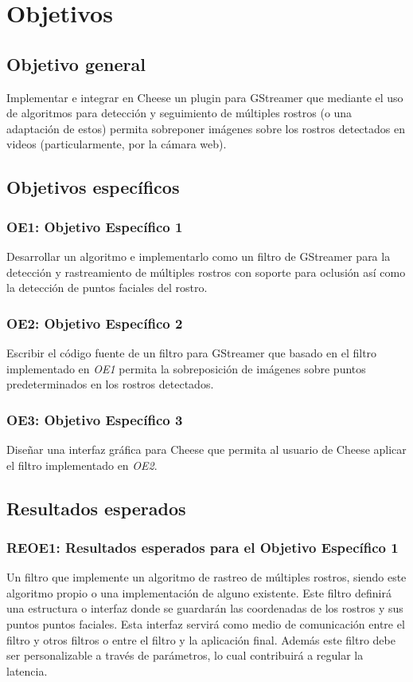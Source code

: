 \documentclass[a4paper,openright,12pt]{report}
\begin{document}
\section{Objetivos}
\subsection{Objetivo general}
Implementar e integrar en Cheese un plugin para GStreamer que mediante el uso de
algoritmos para detección y seguimiento de múltiples rostros (o una adaptación
de estos) permita sobreponer imágenes sobre los rostros detectados en videos
(particularmente, por la cámara web).

\subsection{Objetivos específicos}
\subsubsection{OE1: Objetivo Específico 1}
Desarrollar un algoritmo e implementarlo como un filtro de GStreamer para
la detección y rastreamiento de múltiples rostros con soporte para oclusión
así como la detección de puntos faciales del rostro.
\subsubsection{OE2: Objetivo Específico 2}
Escribir el código fuente de un filtro para GStreamer que basado en el filtro
implementado en \textit{OE1} permita la sobreposición de imágenes sobre puntos
predeterminados en los rostros detectados.
\subsubsection{OE3: Objetivo Específico 3}
Diseñar una interfaz gráfica para Cheese que permita al usuario de Cheese
aplicar el filtro implementado en \textit{OE2}.

\subsection{Resultados esperados}
\subsubsection{REOE1: Resultados esperados para el Objetivo Específico 1}
Un filtro que implemente un algoritmo de rastreo de múltiples rostros, siendo
este algoritmo propio o una implementación de alguno existente. Este filtro
definirá una estructura o interfaz donde se guardarán las coordenadas de los
rostros y sus puntos puntos faciales. Esta interfaz servirá como medio de
comunicación entre el filtro y otros filtros o entre el filtro y la aplicación
final. Además este filtro debe ser personalizable a través de parámetros, lo
cual contribuirá a regular la latencia.
\end{document}
